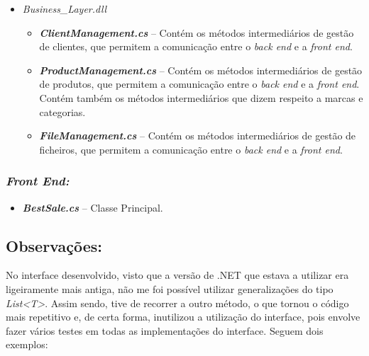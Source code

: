 \documentclass[11pt]{scrartcl} %
\begin{document}
\begin{itemize}
	\item \textit{Business\_Layer.dll}
	\begin{itemize}
		\item \emph{\textbf{ClientManagement.cs}} -- Contém os métodos intermediários de gestão de clientes, que permitem a comunicação entre o \textit{back end} e a \textit{front end}.
		\item \emph{\textbf{ProductManagement.cs}} -- Contém os métodos intermediários de gestão de produtos, que permitem a comunicação entre o \textit{back end} e a \textit{front end}. Contém também os métodos intermediários que dizem respeito a marcas e categorias.
		\item \emph{\textbf{FileManagement.cs}} -- Contém os métodos intermediários de gestão de ficheiros, que permitem a comunicação entre o \textit{back end} e a \textit{front end}.
	\end{itemize}
\end{itemize}


\subsubsection{\textit{Front End:}}
\begin{itemize}
	\item 
	\emph{\textbf{BestSale.cs}} -- Classe Principal.
\end{itemize}


\subsection{Observações:}

No interface desenvolvido, visto que a versão de .NET que estava a utilizar era ligeiramente mais antiga, não me foi possível utilizar generalizações do tipo \textit{List<T>}. Assim sendo, tive de recorrer a outro método, o que tornou o código mais repetitivo e, de certa forma, inutilizou a utilização do interface, pois envolve fazer vários testes em todas as implementações do interface. Seguem dois exemplos:
\end{document}

